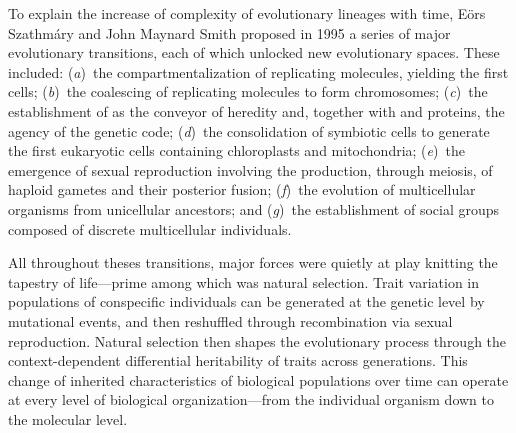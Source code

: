 


To explain the increase of complexity of evolutionary lineages with time, Eörs
Szathmáry and John Maynard Smith proposed in 1995\cite{szathmary_major_1995} a
series of major evolutionary transitions, each of which unlocked new
evolutionary spaces.  These included: (\emph{a})~the compartmentalization of
replicating molecules, yielding the first cells; (\emph{b})~the coalescing of
replicating molecules to form chromosomes; (\emph{c})~the establishment of
 as the conveyor of heredity and, together with 
and proteins, the agency of the genetic code; (\emph{d})~the consolidation of
symbiotic cells to generate the first eukaryotic cells containing chloroplasts
and mitochondria; (\emph{e})~the emergence of sexual reproduction involving the
production, through meiosis, of haploid gametes and their posterior fusion;
(\emph{f})~the evolution of multicellular organisms from unicellular ancestors;
and (\emph{g})~the establishment of social groups composed of discrete
multicellular individuals.


All throughout theses transitions, major forces were quietly at play knitting
the tapestry of life---prime among which was natural selection.  Trait variation
in populations of conspecific individuals can be generated at the genetic level
by mutational events, and then reshuffled through recombination via sexual
reproduction.  Natural selection then shapes the evolutionary process through
the \mbox{context-dependent} differential heritability of traits across
generations.  This change of inherited characteristics of biological populations
over time can operate at every level of biological organization---from the
individual organism down to the molecular level.

